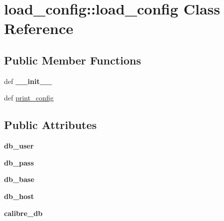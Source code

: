 \hypertarget{classload__config_1_1load__config}{
\section{load\_\-config::load\_\-config Class Reference}
\label{classload__config_1_1load__config}
}
\subsection*{Public Member Functions}
\begin{DoxyCompactItemize}
\item 
\hypertarget{classload__config_1_1load__config_aa6edd77153e28dd4fe10fe1cc5db3374}{
def {\bfseries \_\-\_\-init\_\-\_\-}}
\label{classload__config_1_1load__config_aa6edd77153e28dd4fe10fe1cc5db3374}

\item 
def \hyperlink{classload__config_1_1load__config_a389aef6bdb493eb48ca2dd63e386bcf0}{print\_\-config}
\end{DoxyCompactItemize}
\subsection*{Public Attributes}
\begin{DoxyCompactItemize}
\item 
\hypertarget{classload__config_1_1load__config_ab751681c579311a7864dab80ea48b632}{
{\bfseries db\_\-user}}
\label{classload__config_1_1load__config_ab751681c579311a7864dab80ea48b632}

\item 
\hypertarget{classload__config_1_1load__config_a8e392e407c13c66afa2401625db06bfc}{
{\bfseries db\_\-pass}}
\label{classload__config_1_1load__config_a8e392e407c13c66afa2401625db06bfc}

\item 
\hypertarget{classload__config_1_1load__config_aafc7c9bd0812763c9d14300891312e30}{
{\bfseries db\_\-base}}
\label{classload__config_1_1load__config_aafc7c9bd0812763c9d14300891312e30}

\item 
\hypertarget{classload__config_1_1load__config_adc527ad1403cf44d5570acc511edab3a}{
{\bfseries db\_\-host}}
\label{classload__config_1_1load__config_adc527ad1403cf44d5570acc511edab3a}

\item 
\hypertarget{classload__config_1_1load__config_a3106047394f09c3afb233837d07510d4}{
{\bfseries calibre\_\-db}}
\label{classload__config_1_1load__config_a3106047394f09c3afb233837d07510d4}

\end{DoxyCompactItemize}


